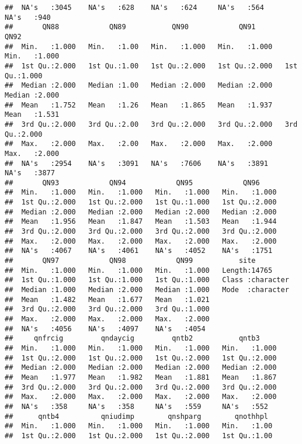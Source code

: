 \documentclass[
]{article}
\begin{document}
\begin{verbatim}
##  NA's   :3045    NA's   :628    NA's   :624     NA's   :564     NA's   :940    
##       QN88            QN89           QN90            QN91            QN92      
##  Min.   :1.000   Min.   :1.00   Min.   :1.000   Min.   :1.000   Min.   :1.000  
##  1st Qu.:2.000   1st Qu.:1.00   1st Qu.:2.000   1st Qu.:2.000   1st Qu.:1.000  
##  Median :2.000   Median :1.00   Median :2.000   Median :2.000   Median :2.000  
##  Mean   :1.752   Mean   :1.26   Mean   :1.865   Mean   :1.937   Mean   :1.531  
##  3rd Qu.:2.000   3rd Qu.:2.00   3rd Qu.:2.000   3rd Qu.:2.000   3rd Qu.:2.000  
##  Max.   :2.000   Max.   :2.00   Max.   :2.000   Max.   :2.000   Max.   :2.000  
##  NA's   :2954    NA's   :3091   NA's   :7606    NA's   :3891    NA's   :3877   
##       QN93            QN94            QN95            QN96      
##  Min.   :1.000   Min.   :1.000   Min.   :1.000   Min.   :1.000  
##  1st Qu.:2.000   1st Qu.:2.000   1st Qu.:1.000   1st Qu.:2.000  
##  Median :2.000   Median :2.000   Median :2.000   Median :2.000  
##  Mean   :1.956   Mean   :1.847   Mean   :1.503   Mean   :1.944  
##  3rd Qu.:2.000   3rd Qu.:2.000   3rd Qu.:2.000   3rd Qu.:2.000  
##  Max.   :2.000   Max.   :2.000   Max.   :2.000   Max.   :2.000  
##  NA's   :4067    NA's   :4061    NA's   :4052    NA's   :1751   
##       QN97            QN98            QN99           site          
##  Min.   :1.000   Min.   :1.000   Min.   :1.000   Length:14765      
##  1st Qu.:1.000   1st Qu.:1.000   1st Qu.:1.000   Class :character  
##  Median :1.000   Median :2.000   Median :1.000   Mode  :character  
##  Mean   :1.482   Mean   :1.677   Mean   :1.021                     
##  3rd Qu.:2.000   3rd Qu.:2.000   3rd Qu.:1.000                     
##  Max.   :2.000   Max.   :2.000   Max.   :2.000                     
##  NA's   :4056    NA's   :4097    NA's   :4054                      
##     qnfrcig         qndaycig         qntb2           qntb3      
##  Min.   :1.000   Min.   :1.000   Min.   :1.000   Min.   :1.000  
##  1st Qu.:2.000   1st Qu.:2.000   1st Qu.:2.000   1st Qu.:2.000  
##  Median :2.000   Median :2.000   Median :2.000   Median :2.000  
##  Mean   :1.977   Mean   :1.982   Mean   :1.881   Mean   :1.867  
##  3rd Qu.:2.000   3rd Qu.:2.000   3rd Qu.:2.000   3rd Qu.:2.000  
##  Max.   :2.000   Max.   :2.000   Max.   :2.000   Max.   :2.000  
##  NA's   :358     NA's   :358     NA's   :559     NA's   :552    
##      qntb4          qniudimp        qnshparg        qnothhpl    
##  Min.   :1.000   Min.   :1.000   Min.   :1.000   Min.   :1.00   
##  1st Qu.:2.000   1st Qu.:2.000   1st Qu.:2.000   1st Qu.:1.00   

\end{verbatim}
\end{document}
